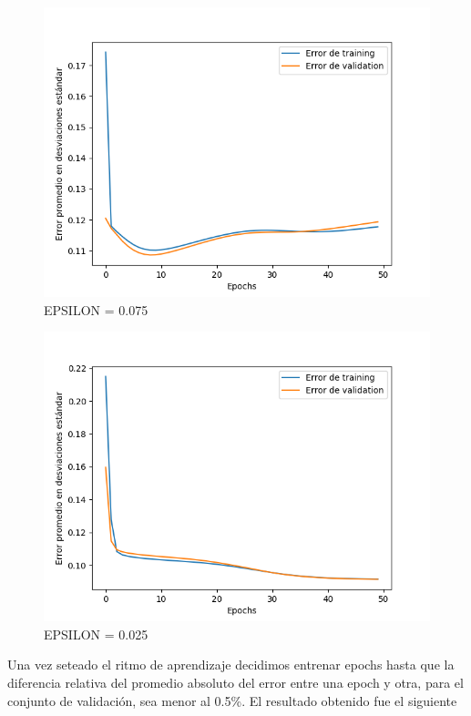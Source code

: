 \documentclass[
]{article}
\begin{document}
\begin{figure}
\centering
\includegraphics{mlp_imgs/pendulum_50epochs_eps0075.png}
\caption{EPSILON = 0.075}
\end{figure}

\begin{figure}
\centering
\includegraphics{mlp_imgs/pendulum_50epochs_eps0025.png}
\caption{EPSILON = 0.025}
\end{figure}

Una vez seteado el ritmo de aprendizaje decidimos entrenar epochs hasta
que la diferencia relativa del promedio absoluto del error entre una
epoch y otra, para el conjunto de validación, sea menor al 0.5\%. El
resultado obtenido fue el siguiente
\end{document}
